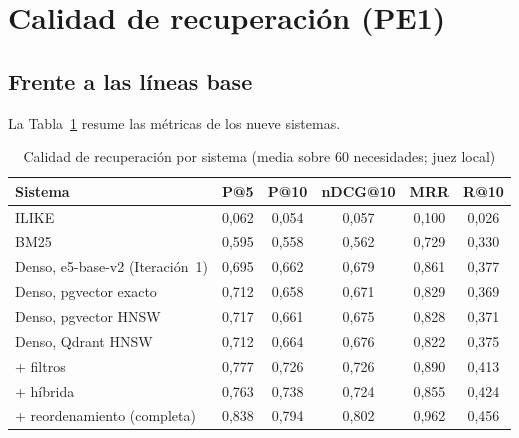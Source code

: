 
\section{Calidad de recuperación (PE1)}
\label{sec:res-pe1}

\subsection{Frente a las líneas base}

La Tabla~\ref{tab:res-pe1-global} resume las métricas de los nueve sistemas.

\begin{table}[htbp!]
    \centering
    \caption{Calidad de recuperación por sistema (media sobre 60 necesidades; juez local)}
    \label{tab:res-pe1-global}
    \begin{tabular}{|l|c|c|c|c|c|}
        \hline
        \textbf{Sistema} & \textbf{P@5} & \textbf{P@10} & \textbf{nDCG@10} & \textbf{MRR} & \textbf{R@10} \\
        \hline
        ILIKE & 0{,}062 & 0{,}054 & 0{,}057 & 0{,}100 & 0{,}026 \\
        \hline
        BM25 & 0{,}595 & 0{,}558 & 0{,}562 & 0{,}729 & 0{,}330 \\
        \hline
        Denso, e5-base-v2 (Iteración~1) & 0{,}695 & 0{,}662 & 0{,}679 & 0{,}861 & 0{,}377 \\
        \hline
        Denso, pgvector exacto & 0{,}712 & 0{,}658 & 0{,}671 & 0{,}829 & 0{,}369 \\
        \hline
        Denso, pgvector HNSW & 0{,}717 & 0{,}661 & 0{,}675 & 0{,}828 & 0{,}371 \\
        \hline
        Denso, Qdrant HNSW & 0{,}712 & 0{,}664 & 0{,}676 & 0{,}822 & 0{,}375 \\
        \hline
        + filtros & 0{,}777 & 0{,}726 & 0{,}726 & 0{,}890 & 0{,}413 \\
        \hline
        + híbrida & 0{,}763 & 0{,}738 & 0{,}724 & 0{,}855 & 0{,}424 \\
        \hline
        + reordenamiento (completa) & 0{,}838 & 0{,}794 & 0{,}802 & 0{,}962 & 0{,}456 \\
        \hline
    \end{tabular}
\end{table}

